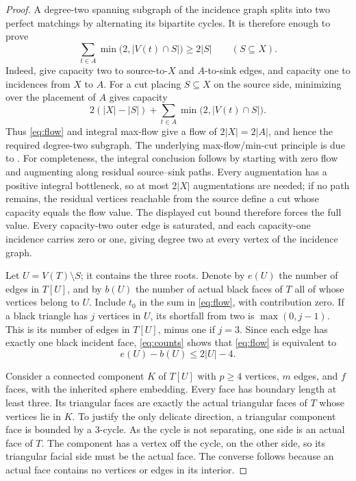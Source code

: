 \documentclass[11pt]{article}
\theoremstyle{remark}
\newcommand{\abs}[1]{\left|#1\right|}
\numberwithin{equation}{section}
\begin{document}
\begin{proof}
A degree-two spanning subgraph of the incidence graph splits
into two perfect matchings by alternating its bipartite cycles.
It is therefore enough to prove
\begin{equation}\label{eq:flow}
 \sum_{t\in A}\min\bigl(2,\abs{V(t)\cap S}\bigr)\ge2\abs S
 \qquad(S\subseteq X).
\end{equation}
Indeed, give capacity two to source-to-\(X\) and
\(A\)-to-sink edges, and capacity one to incidences from \(X\)
to \(A\). For a cut placing \(S\subseteq X\) on the source side,
minimizing over the placement of \(A\) gives capacity
\[
 2(\abs X-\abs S)+
 \sum_{t\in A}\min\bigl(2,\abs{V(t)\cap S}\bigr).
\]
Thus \eqref{eq:flow} and integral max-flow give a flow of
\(2\abs X=2\abs A\), and hence the required degree-two subgraph.
The underlying max-flow/min-cut principle is due to
\citet{FF1956}. For completeness, the integral conclusion follows
by starting with zero
flow and augmenting along residual source--sink paths. Every augmentation
has a positive integral bottleneck, so at most \(2\abs X\) augmentations
are needed; if no path remains, the residual vertices reachable from the
source define a cut whose capacity equals the flow value. The displayed
cut bound therefore forces the full value. Every capacity-two outer edge
is saturated, and each capacity-one incidence carries zero or one,
giving degree two at every vertex of the incidence graph.

Let \(U=V(T)\setminus S\); it contains the three roots.
Denote by \(e(U)\) the number of edges in \(T[U]\), and by
\(b(U)\) the number of actual black faces of \(T\) all of whose
vertices belong to \(U\). Include \(t_0\) in the sum in
\eqref{eq:flow}, with contribution zero. If a black triangle
has \(j\) vertices in \(U\), its shortfall from two is
\(\max(0,j-1)\). This is its number of edges in \(T[U]\), minus
one if \(j=3\). Since each edge has exactly one black incident
face, \eqref{eq:counts} shows that \eqref{eq:flow} is equivalent to
\begin{equation}\label{eq:density}
 e(U)-b(U)\le2\abs U-4.
\end{equation}

Consider a connected component \(K\) of \(T[U]\) with \(p\ge4\)
vertices, \(m\) edges, and \(f\) faces, with the inherited
sphere embedding. Every face has boundary length at least three.
Its triangular faces are exactly the actual triangular faces
of \(T\) whose vertices lie in \(K\). To justify the only
delicate direction, a triangular component face is bounded
by a \(3\)-cycle. As the cycle is not separating, one side is
an actual face of \(T\). The component has a vertex off the
cycle, on the other side, so its triangular facial side must
be the actual face. The converse follows because an actual
face contains no vertices or edges in its interior.


\end{proof}
\end{document}
